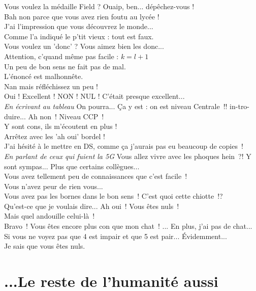 \documentclass[french, a4paper, openany]{book}
\begin{document}
	\noindent \og Vous voulez la médaille Field ? Ouaip, ben... dépêchez-vous ! \fg \\
	\og Bah non parce que vous avez rien foutu au lycée ! \fg \\
	\og J'ai l'impression que vous découvrez le monde... \fg \\
	\og Comme l'a indiqué le p'tit vieux : tout est faux. \fg \\
	\og Vous voulez un 'donc' ? Vous aimez bien les donc... \fg \\
	\og Attention, c'quand même pas facile : $k = l+ 1$ \fg \\
	\og Un peu de bon sens ne fait pas de mal. \fg \\
	\og L'énoncé est malhonnête. \fg \\
	\og Nan mais réfléchissez un peu ! \fg \\
	\og Oui ! Excellent ! NON ! NUL ! C'était presque excellent... \fg \\
	\emph{En écrivant au tableau} \og On pourra... Ça y est : on est niveau Centrale~!! in-tro-duire... Ah non~! Niveau CCP~! \fg \\
	\og Y sont cons, ils m'écoutent en plus ! \fg \\
	\og Arrêtez avec les 'ah oui' bordel ! \fg \\
	\og J'ai hésité à le mettre en DS, comme ça j'aurais pas eu beaucoup de copies~!\fg \\
	\emph{En parlant de ceux qui fuient la 5G} \og Vous allez vivre avec les phoques hein~?! Y sont sympas... Plus que certains collègues... \fg \\
	\og Vous avez tellement peu de connaissances que c'est facile~! \fg \\
	\og Vous n'avez peur de rien vous... \fg \\	
	\og Vous avez pas les bornes dans le bon sens~! C'est quoi cette chiotte~!? \fg \\
	\og Qu'est-ce que je voulais dire... Ah oui~! Vous êtes nuls~! \fg \\
	\og Mais quel andouille celui-là~! \fg \\
	\og Bravo~! Vous êtes encore plus con que mon chat~! ... En plus, j'ai pas de chat... \fg \\
	\og Si vous ne voyez pas que 4 est impair et que 5 est pair... Évidemment... \fg \\
	\og Je sais que vous êtes nuls. \fg \\
	
\chapter{...Le reste de l'humanité aussi}
\end{document}
